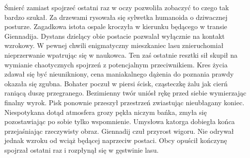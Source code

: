 \documentclass[../MAIN.tex]{subfiles}
\begin{document}
Śmierć zamiast spojrzeć ostatni raz w oczy pozwoliła zobaczyć to czego tak bardzo szukał. Za drzewami rysowała się sylwetka humanoida o dziwacznej posturze. Zagadkowa istota ospale kroczyła w kierunku będącego w transie Giennadija. Dystans dzielący obie postacie pozwalał wyłącznie na kontakt wzrokowy. W pewnej chwili enigmatyczny mieszkaniec lasu znieruchomiał nieprzerwanie wpatrując się w naukowca. Ten zaś ostatnie resztki sił skupił na wymianie chaotycznych spojrzeń z potencjalnym przeciwnikiem. Kres życia zdawał się być nieunikniony, cena maniakalnego dążenia do poznania prawdy okazała się zgubna. Bohater poczuł w piersi ścisk, cząsteczkę żalu jak cierń raniącą duszę przegranego. Bezimienny twór uniósł rękę przed siebie wymierzając finalny wyrok. Pisk ponownie przeszył przestrzeń zwiastując nieubłagany koniec. Niespotykana dotąd atmosfera grozy pękła niczym bańka, zmyła się pozostawiając po sobie tylko wspomnienie. Umysłowa katorga dobiegła końca przejaśniając rzeczywisty obraz. Giennadij czuł przyrost 
wigoru. Nie odrywał jednak wzroku od wciąż będącej naprzeciw postaci. Obcy opuścił kończynę spojrzał ostatni raz i rozpłynął się w gęstwinie lasu. 
\end{document}
